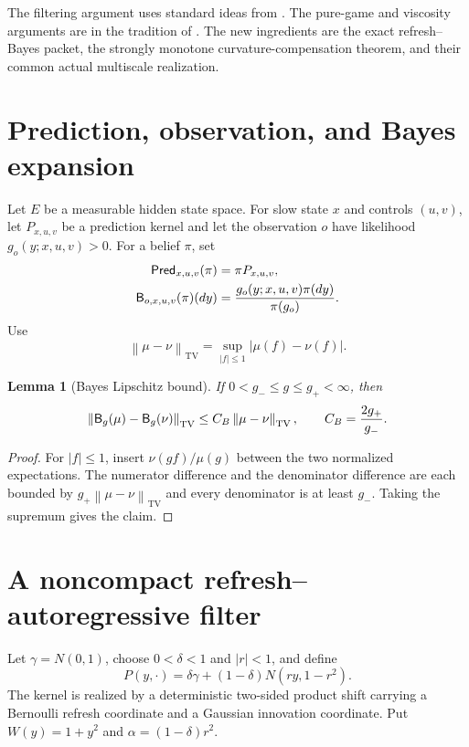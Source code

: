 \documentclass[11pt,reqno]{amsart}
\newtheorem{lemma}[theorem]{Lemma}
\theoremstyle{definition}
\theoremstyle{remark}
\newcommand{\TV}{\mathrm{TV}}
\newcommand{\norm}[1]{\left\lVert #1\right\rVert}
\newcommand{\abs}[1]{\left\lvert #1\right\rvert}
\begin{document}
The filtering argument uses standard ideas from \cite{BainCrisan2009,
AtarZeitouni1997,vanHandel2009}.  The pure-game and viscosity arguments are in
the tradition of \cite{Sion1958,FlemingSouganidis1989,FlemingSoner2006,
BuckdahnLi2008}.  The new ingredients are the exact refresh--Bayes packet, the
strongly monotone curvature-compensation theorem, and their common actual
multiscale realization.

\section{Prediction, observation, and Bayes expansion}\label{sec:Bayes}
Let $E$ be a measurable hidden state space.  For slow state $x$ and controls
$(u,v)$, let $P_{x,u,v}$ be a prediction kernel and let the observation $o$ have
likelihood $g_o(y;x,u,v)>0$.  For a belief $\pi$, set
\begin{align}
 \mathsf{Pred}_{x,u,v}(\pi)&=\pi P_{x,u,v},\label{eq:pred}\\
 \mathsf B_{o,x,u,v}(\pi)(dy)&=
 {g_o(y;x,u,v)\pi(dy)\over\pi(g_o)}.
 \label{eq:Bayes}
\end{align}
Use
\[
 \norm{\mu-\nu}_{\TV}=
 \sup_{\abs f\le1}\abs{\mu(f)-\nu(f)}.
\]

\begin{lemma}[Bayes Lipschitz bound]\label{lem:Bayes}
If $0<g_-\le g\le g_+<\infty$, then
\[
 \norm{\mathsf B_g(\mu)-\mathsf B_g(\nu)}_{\TV}
 \le C_B\norm{\mu-\nu}_{\TV},
 \qquad C_B={2g_+\over g_-}.
\]
\end{lemma}

\begin{proof}
For $\abs f\le1$, insert $\nu(gf)/\mu(g)$ between the two normalized
expectations.  The numerator difference and the denominator difference are
each bounded by $g_+\norm{\mu-\nu}_{\TV}$ and every denominator is at least
$g_-$.  Taking the supremum gives the claim.
\end{proof}

\section{A noncompact refresh--autoregressive filter}\label{sec:filter}
Let $\gamma=N(0,1)$, choose $0<\delta<1$ and $\abs r<1$, and define
\begin{equation}\label{eq:kernel}
 P(y,\cdot)=\delta\gamma+(1-\delta)N(ry,1-r^2).
\end{equation}
The kernel is realized by a deterministic two-sided product shift carrying a
Bernoulli refresh coordinate and a Gaussian innovation coordinate.  Put
$W(y)=1+y^2$ and $\alpha=(1-\delta)r^2$.
\end{document}
